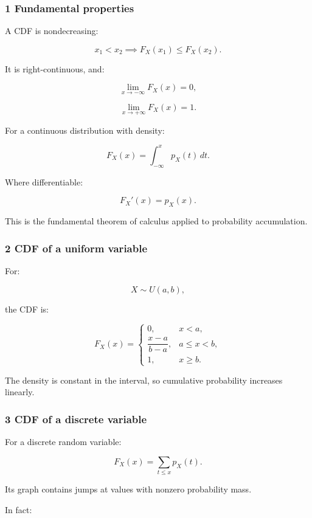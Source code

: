 \subsubsection{1 Fundamental properties}\label{02-foundations-ii-ch023-fundamental-properties}

A CDF is nondecreasing:

\[
 x_1<x_2 \implies F_X(x_1)\le F_X(x_2).
\]

It is right-continuous, and:

\[
 \lim_{x\to-\infty}F_X(x)=0,
\]

\[
 \lim_{x\to+\infty}F_X(x)=1.
\]

For a continuous distribution with density:

\[
 \boxed{ F_X(x)=\int_{-\infty}^{x}p_X(t)\,dt }.
\]

Where differentiable:

\[
 \boxed{ F_X'(x)=p_X(x) }.
\]

This is the fundamental theorem of calculus applied to probability accumulation.

\subsubsection{2 CDF of a uniform variable}\label{02-foundations-ii-ch023-cdf-of-a-uniform-variable}

For:

\[
 X\sim U(a,b),
\]

the CDF is:

\[
 \boxed{ F_X(x)= \begin{cases} 0,&x<a,\\ \dfrac{x-a}{b-a},&a\le x<b,\\ 1,&x\ge b. \end{cases} }
\]

The density is constant in the interval, so cumulative probability increases linearly.

\subsubsection{3 CDF of a discrete variable}\label{02-foundations-ii-ch023-cdf-of-a-discrete-variable}

For a discrete random variable:

\[
 F_X(x)= \sum_{t\le x}p_X(t).
\]

Its graph contains jumps at values with nonzero probability mass.

In fact:

